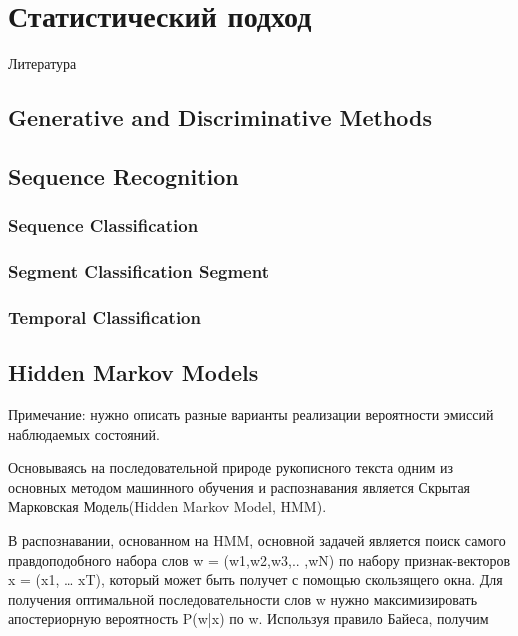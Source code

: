 \chapter{Статистический подход} \label{chapt3}

Литература \cite{шлезингер2004десять, bishop2006pattern, graves2013generating, graves2012supervised, murphy2012machine}

\section{Generative and Discriminative Methods} \label{sect3_1}

\section{Sequence Recognition} \label{sect3_2}


\subsection{Sequence Classification} \label{subsect3_2_1}
\subsection{Segment Classification Segment} \label{subsect3_2_1}
\subsection{Temporal Classification} \label{subsect3_2_1}

\section{Hidden Markov Models} \label{sect3_3}

Примечание: нужно описать разные варианты реализации вероятности эмиссий наблюдаемых состояний.

Основываясь на последовательной природе рукописного текста одним из основных методом машинного обучения и распознавания является Скрытая Марковская Модель(Hidden Markov Model, HMM).

В распознавании, основанном на HMM, основной задачей является поиск самого правдоподобного набора слов w = (w1,w2,w3,.. ,wN) по набору признак-векторов x = (x1, … xT), который может быть получет с помощью скользящего окна.
Для получения оптимальной последовательности слов w нужно максимизировать апостериорную вероятность P(w|x) по w. Используя правило Байеса, получим


